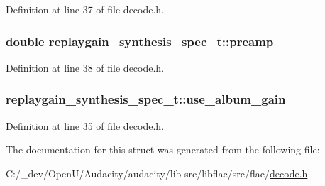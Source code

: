 Definition at line 37 of file decode.\+h.

\subsubsection[{\texorpdfstring{preamp}{preamp}}]{\setlength{\rightskip}{0pt plus 5cm}double replaygain\+\_\+synthesis\+\_\+spec\+\_\+t\+::preamp}\hypertarget{structreplaygain__synthesis__spec__t_a3966f7fdc85242f3608dc15a4823995d}{}\label{structreplaygain__synthesis__spec__t_a3966f7fdc85242f3608dc15a4823995d}


Definition at line 38 of file decode.\+h.

\subsubsection[{\texorpdfstring{use\+\_\+album\+\_\+gain}{use_album_gain}}]{ replaygain\+\_\+synthesis\+\_\+spec\+\_\+t\+::use\+\_\+album\+\_\+gain}\hypertarget{structreplaygain__synthesis__spec__t_a9e33ee4f9518f652c890b5daca373aa4}{}\label{structreplaygain__synthesis__spec__t_a9e33ee4f9518f652c890b5daca373aa4}


Definition at line 35 of file decode.\+h.



The documentation for this struct was generated from the following file\+:\begin{DoxyCompactItemize}
\item 
C\+:/\+\_\+dev/\+Open\+U/\+Audacity/audacity/lib-\/src/libflac/src/flac/\hyperlink{decode_8h}{decode.\+h}\end{DoxyCompactItemize}
